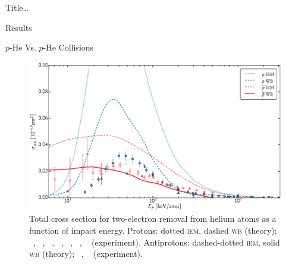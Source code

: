 \documentclass[letterpaper, 11 pt]{report}
\begin{document}
\begin{chapter}{ Title\dots \label{chap:p-he2p-he}}
\begin{section}{Results \label{sec:phe2p-res}}
\begin{subsection}{ \texorpdfstring{$\bar{p}$}{pbar}-He Vs. \texorpdfstring{$p$}{p}-He Collisions
                         \label{sec:pbarhe-res}}
         \begin{figure}[t]
            \centering
            \includegraphics[width = 0.95 \linewidth]{./images/pbarhe/pbarhe-++.eps}
            \caption[Total cross section for two-electron removal from helium atoms as a function of
                     impact energy]
                    {Total cross section for two-electron removal from helium atoms as a function
                     of impact energy. Protons: dotted \textsc{iem}, dashed \textsc{wb} (theory);
                     {\color{blue}{$\blacktriangle$}}~\cite{DTR84}, {\color{blue}{$+$}}~\cite{Sol62},
                     {\color{blue}{$\bullet$}}~\cite{SG89},
                     {\color{blue}{$\blacklozenge$}}~\cite{SG85},
                    {\color{blue}{$\blacktriangleright$}}~\cite{PM70},
                    {\color{blue}{$\blacktriangledown$}}~\cite{Wex64},
                    {\color{blue}{$\blacksquare$}}~\cite{KAH84} (experiment).
                    Antiprotons: dashed-dotted \textsc{iem}, solid \textsc{wb} (theory);
                    {\color{red}{$\circ$}}~\cite{HKM94}, {\color{red}{$\triangleleft$}}~\cite{KKT09}
                       (experiment). \label{fig:he++}}
         \end{figure}


\end{subsection}
\end{section}
\end{chapter}
\end{document}

